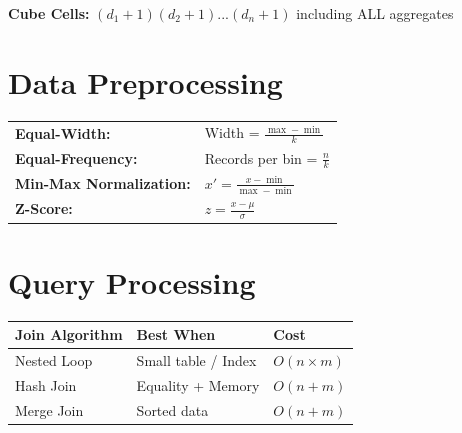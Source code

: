 \begin{center}
\textbf{Cube Cells:} $(d_1+1)(d_2+1)...(d_n+1)$ including ALL aggregates
\end{center}

\section{Data Preprocessing}

\begin{center}
\end{center}

\begin{center}
\begin{tabular}{ll}
\textbf{Equal-Width:} & Width = $\frac{\max - \min}{k}$ \\
\textbf{Equal-Frequency:} & Records per bin = $\frac{n}{k}$ \\
\textbf{Min-Max Normalization:} & $x' = \frac{x - \min}{\max - \min}$ \\
\textbf{Z-Score:} & $z = \frac{x - \mu}{\sigma}$ \\
\end{tabular}
\end{center}

\section{Query Processing}

\begin{center}
\begin{tabular}{lll}
\toprule
\textbf{Join Algorithm} & \textbf{Best When} & \textbf{Cost} \\
\midrule
Nested Loop & Small table / Index & $O(n \times m)$ \\
Hash Join & Equality + Memory & $O(n + m)$ \\
Merge Join & Sorted data & $O(n + m)$ \\
\bottomrule
\end{tabular}
\end{center}

